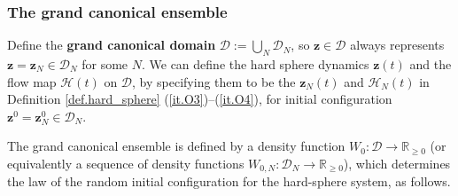 \documentclass[10pt, reqno]{amsart}
\newcommand{\Rb}{\mathbb R}
\newcommand{\Dc}{\mathcal D}
\newcommand{\Hc}{\mathcal H}
\newcommand{\vz}{\boldsymbol{z}}
\theoremstyle{definition}
\theoremstyle{remark}
\numberwithin{equation}{section}
\begin{document}
\subsubsection{The grand canonical ensemble}\label{sec.grand_canon} Define the \textbf{grand canonical domain} $\Dc:=\bigcup_{N}\Dc_N$, so $\vz\in\Dc$ always represents $\vz=\vz_N\in\Dc_N$ for some $N$. We can define the hard sphere dynamics $\vz(t)$ and the flow map $\Hc(t)$ on $\Dc$, by specifying them to be the $\vz_N(t)$ and $\Hc_N(t)$ in Definition \ref{def.hard_sphere} (\ref{it.O3})--(\ref{it.O4}), for initial configuration $\vz^0=\vz_N^0\in\Dc_N$.

The grand canonical ensemble is defined by a density function $W_0:\Dc\to\Rb_{\geq 0}$ (or equivalently a sequence of density functions $W_{0,N}:\Dc_N\to\Rb_{\geq 0}$), which determines the law of the random initial configuration for the hard-sphere system, as follows.
\end{document}
